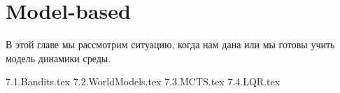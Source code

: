 \documentclass[../main.tex]{subfiles}
\begin{document}
\chapter{Model-based}\label{modelbasedchapter}

В этой главе мы рассмотрим ситуацию, когда нам дана или мы готовы учить модель динамики среды. 

{7.1.Bandits.tex}
{7.2.WorldModels.tex}
{7.3.MCTS.tex}
{7.4.LQR.tex}
\end{document}
